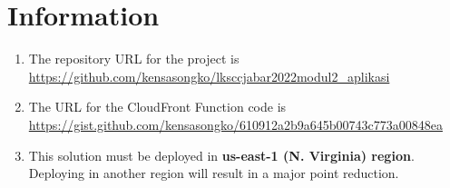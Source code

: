\documentclass{article}
\begin{document}
\section{Information}\label{information}
\begin{enumerate}
    \item The repository URL for the project is \href{https://github.com/kensasongko/lksccjabar2022modul2_aplikasi}{https://github.com/kensasongko/lksccjabar2022modul2\_aplikasi}
    \item The URL for the CloudFront Function code is \href{https://gist.github.com/kensasongko/610912a2b9a645b00743c773a00848ea}{https://gist.github.com/kensasongko/610912a2b9a645b00743c773a00848ea}
    \item This solution must be deployed in \textbf{us-east-1 (N. Virginia) region}. Deploying in another region will result in a major point reduction.
\end{enumerate}
\end{document}
